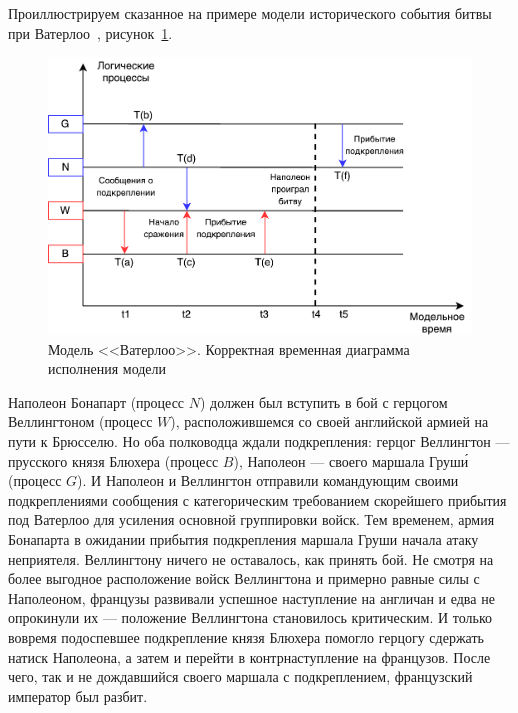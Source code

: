 
Проиллюстрируем сказанное на примере модели исторического события битвы при Ватерлоо~\cite{napoleon}, рисунок~\ref{fig:Корректная временная диаграмма исполнения модели}.

\begin{figure}[!ht]
\centering
\includegraphics[scale=1]{images/waterloo.pdf}
\caption{Модель <<Ватерлоо>>. Корректная временная диаграмма исполнения модели}
\label{fig:Корректная временная диаграмма исполнения модели}
\end{figure}

Наполеон Бонапарт (процесс $N$) должен был вступить в бой с герцогом Веллингтоном (процесс $W$), расположившемся со своей английской армией на пути к Брюсселю. Но оба полководца ждали подкрепления: герцог Веллингтон --- прусского князя Блюхера (процесс $B$), Наполеон --- своего маршала Груш\'и (процесс $G$). И Наполеон и Веллингтон отправили командующим своими подкреплениями сообщения с категорическим требованием скорейшего прибытия под Ватерлоо для усиления основной группировки войск. Тем временем, армия Бонапарта в ожидании прибытия подкрепления маршала Груши начала атаку неприятеля. Веллингтону ничего не оставалось, как принять бой. Не смотря на более выгодное расположение войск Веллингтона и примерно равные силы с Наполеоном, французы развивали успешное наступление на англичан и едва не опрокинули их --- положение Веллингтона становилось критическим. И только вовремя подоспевшее подкрепление князя Блюхера помогло герцогу сдержать натиск Наполеона, а затем и перейти в контрнаступление на французов. После чего, так и не дождавшийся своего маршала с подкреплением, французский император был разбит.

